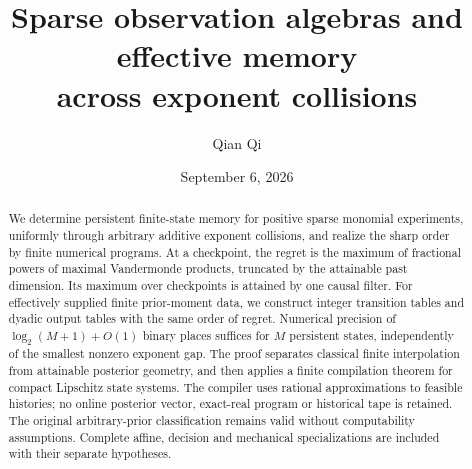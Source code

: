 \documentclass[11pt]{amsart}
\title[Effective memory across exponent collisions]{Sparse observation algebras and effective memory\\ across exponent collisions}
\author{Qian Qi}
\date{September 6, 2026}
\theoremstyle{definition}\newtheorem{definition}[theorem]{Definition}
\theoremstyle{remark}\newtheorem{remark}[theorem]{Remark}
\begin{document}
\begin{abstract}
We determine persistent finite-state memory for positive sparse monomial
experiments, uniformly through arbitrary additive exponent collisions,
and realize the sharp order by finite numerical programs. At a checkpoint,
the regret is the maximum of fractional powers of maximal Vandermonde
products, truncated by the attainable past dimension. Its maximum over
checkpoints is attained by one causal filter. For effectively supplied
finite prior-moment data, we construct integer transition tables and
dyadic output tables with the same order of regret. Numerical precision
of $\log_2(M+1)+O(1)$ binary places suffices for $M$ persistent states,
independently of the smallest nonzero exponent gap. The proof separates
classical finite interpolation from attainable posterior geometry, and
then applies a finite compilation theorem for compact Lipschitz state
systems. The compiler uses rational approximations to feasible histories;
no online posterior vector, exact-real program or historical tape is
retained. The original arbitrary-prior classification remains valid
without computability assumptions. Complete affine, decision and
mechanical specializations are included with their separate hypotheses.
\end{abstract}
\maketitle









\appendix








\end{document}
